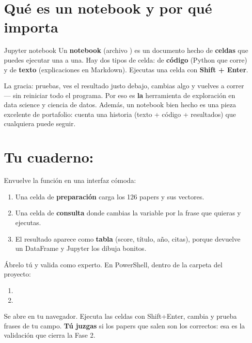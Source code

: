 \documentclass[11pt,a4paper]{article}
\begin{document}

\section{Qué es un notebook y por qué importa}

\begin{concepto}{Jupyter notebook}
Un \textbf{notebook} (archivo ) es un documento hecho de \textbf{celdas} que
puedes ejecutar una a una. Hay dos tipos de celda: de \textbf{código} (Python que corre) y de
\textbf{texto} (explicaciones en Markdown). Ejecutas una celda con \textbf{Shift + Enter}.
\end{concepto}

La gracia: pruebas, ves el resultado justo debajo, cambias algo y vuelves a correr --- sin
reiniciar todo el programa. Por eso es \textbf{la} herramienta de exploración en data science
y ciencia de datos. Además, un notebook bien hecho es una pieza excelente de portafolio:
cuenta una historia (texto + código + resultados) que cualquiera puede seguir.

\section{Tu cuaderno: }

Envuelve la función  en una interfaz cómoda:
\begin{enumerate}
  \item Una celda de \textbf{preparación} carga los 126 papers y sus vectores.
  \item Una celda de \textbf{consulta} donde cambias la variable  por la
        frase que quieras y ejecutas.
  \item El resultado aparece como \textbf{tabla} (score, título, año, citas), porque
         devuelve un DataFrame y Jupyter los dibuja bonitos.
\end{enumerate}

\begin{practica}
Ábrelo tú y valida como experto. En PowerShell, dentro de la carpeta del proyecto:
\begin{enumerate}
  \item {}
  \item {}
\end{enumerate}
Se abre en tu navegador. Ejecuta las celdas con Shift+Enter, cambia  y
prueba frases de tu campo. \textbf{Tú juzgas} si los papers que salen son los correctos: esa
es la validación que cierra la Fase 2.
\end{practica}
\end{document}
